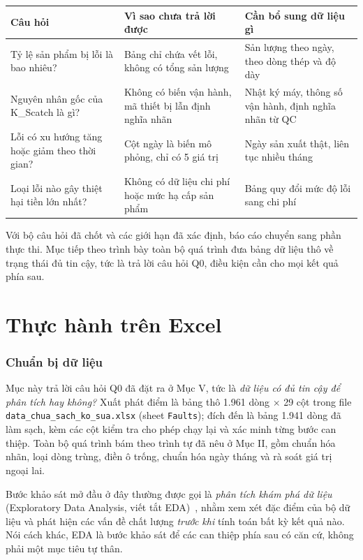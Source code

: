 \documentclass[12pt]{article}
\begin{document}
\begin{center}
\small
\begin{tabular}{@{}p{5.9cm} p{4.4cm} p{5.5cm}@{}}
\toprule
\textbf{Câu hỏi} & \textbf{Vì sao chưa trả lời được} & \textbf{Cần bổ sung dữ liệu gì} \\
\midrule
Tỷ lệ sản phẩm bị lỗi là bao nhiêu? & Bảng chỉ chứa vết lỗi, không có tổng sản lượng & Sản lượng theo ngày, theo dòng thép và độ dày \\
\addlinespace[3pt]
Nguyên nhân gốc của K\_Scatch là gì? & Không có biến vận hành, mã thiết bị lẫn định nghĩa nhãn & Nhật ký máy, thông số vận hành, định nghĩa nhãn từ QC \\
\addlinespace[3pt]
Lỗi có xu hướng tăng hoặc giảm theo thời gian? & Cột ngày là biến mô phỏng, chỉ có 5 giá trị & Ngày sản xuất thật, liên tục nhiều tháng \\
\addlinespace[3pt]
Loại lỗi nào gây thiệt hại tiền lớn nhất? & Không có dữ liệu chi phí hoặc mức hạ cấp sản phẩm & Bảng quy đổi mức độ lỗi sang chi phí \\
\bottomrule
\end{tabular}
\end{center}

\noindent Với bộ câu hỏi đã chốt và các giới hạn đã xác định, báo cáo chuyển sang phần thực thi. Mục tiếp theo trình bày toàn bộ quá trình đưa bảng dữ liệu thô về trạng thái đủ tin cậy, tức là trả lời câu hỏi Q0, điều kiện cần cho mọi kết quả phía sau.

\clearpage
\part{Thực hành trên Excel}

\section{Chuẩn bị dữ liệu}
Mục này trả lời câu hỏi Q0 đã đặt ra ở Mục V, tức là \emph{dữ liệu có đủ tin cậy để phân tích hay không?} Xuất phát điểm là bảng thô 1.961 dòng $\times$ 29 cột trong file \texttt{data\_chua\_sach\_ko\_sua.xlsx} (sheet \texttt{Faults}); đích đến là bảng 1.941 dòng đã làm sạch, kèm các cột kiểm tra cho phép chạy lại và xác minh từng bước can thiệp. Toàn bộ quá trình bám theo trình tự đã nêu ở Mục II, gồm chuẩn hóa nhãn, loại dòng trùng, điền ô trống, chuẩn hóa ngày tháng và rà soát giá trị ngoại lai.

\noindent Bước khảo sát mở đầu ở đây thường được gọi là \emph{phân tích khám phá dữ liệu} (Exploratory Data Analysis, viết tắt EDA)~\cite{tukey1977}, nhằm xem xét đặc điểm của bộ dữ liệu và phát hiện các vấn đề chất lượng \emph{trước khi} tính toán bất kỳ kết quả nào. Nói cách khác, EDA là bước khảo sát để các can thiệp phía sau có căn cứ, không phải một mục tiêu tự thân.
\end{document}
